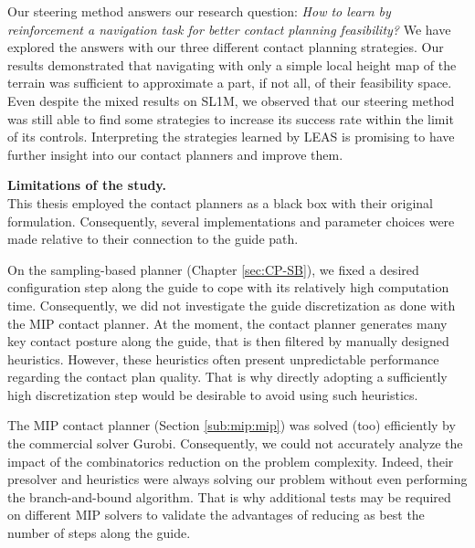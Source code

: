Our steering method answers our research question: \textit{How to learn by reinforcement a navigation task for better contact planning feasibility?}
We have explored the answers with our three different contact planning strategies.
Our results demonstrated that navigating with only a simple local height map of the terrain was sufficient to approximate a part, if not all, of their feasibility space.
Even despite the mixed results on SL1M, we observed that our steering method was still able to find some strategies to increase its success rate within the limit of its controls.
Interpreting the strategies learned by LEAS is promising to have further insight into our contact planners and improve them.


\hfill \break

\noindent\textbf{Limitations of the study.}\\

This thesis employed the contact planners as a black box with their original formulation. Consequently, several implementations and parameter choices were made relative to their connection to the guide path.

On the sampling-based planner (Chapter \ref{sec:CP-SB}), we fixed a desired configuration step along the guide to cope with its relatively high computation time. 
Consequently, we did not investigate the guide discretization as done with the MIP contact planner.
At the moment, the contact planner generates many key contact posture along the guide, that is then filtered by manually designed heuristics. 
However, these heuristics often present unpredictable performance regarding the contact plan quality.
That is why directly adopting a sufficiently high discretization step would be desirable to avoid using such heuristics.

The MIP contact planner (Section \ref{sub:mip:mip}) was solved (too) efficiently by the commercial solver Gurobi. Consequently, we could not accurately analyze the impact of the combinatorics reduction on the problem complexity. Indeed, their presolver and heuristics were always solving our problem without even performing the branch-and-bound algorithm.
That is why additional tests may be required on different MIP solvers to validate the advantages of reducing as best the number of steps along the guide.


